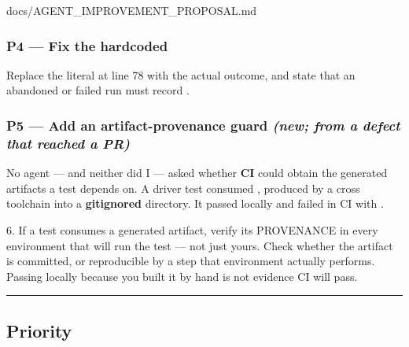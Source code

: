 \begin{relocated}{docs/AGENT_IMPROVEMENT_PROPOSAL.md}
\subsubsection{\texorpdfstring{P4 --- Fix the hardcoded
}{P4 --- Fix the hardcoded }}\label{tm:dec:agent-improvement-proposal:p4-fix-the-hardcoded-signoff-achieved}

Replace the literal  at line 78 with the actual outcome, and
state that an abandoned or failed run must record .

\subsubsection{\texorpdfstring{P5 --- Add an artifact-provenance guard
\emph{(new; from a defect that reached a
PR)}}{P5 --- Add an artifact-provenance guard (new; from a defect that reached a PR)}}\label{tm:dec:agent-improvement-proposal:p5-add-an-artifact-provenance-guard-new-from-a-defect-that-reached-a-pr}

No agent --- and neither did I --- asked whether \textbf{CI} could
obtain the generated artifacts a test depends on. A driver test consumed
, produced by a cross toolchain into a
\textbf{gitignored} directory. It passed locally and failed in CI with
.

\begin{textblock}
6. If a test consumes a generated artifact, verify its PROVENANCE in every environment that
   will run the test — not just yours. Check whether the artifact is committed, or
   reproducible by a step that environment actually performs. Passing locally because you
   built it by hand is not evidence CI will pass.
\end{textblock}

\begin{center}\rule{0.5\linewidth}{0.5pt}\end{center}

\subsection{Priority}\label{tm:dec:agent-improvement-proposal:priority}


\end{relocated}
